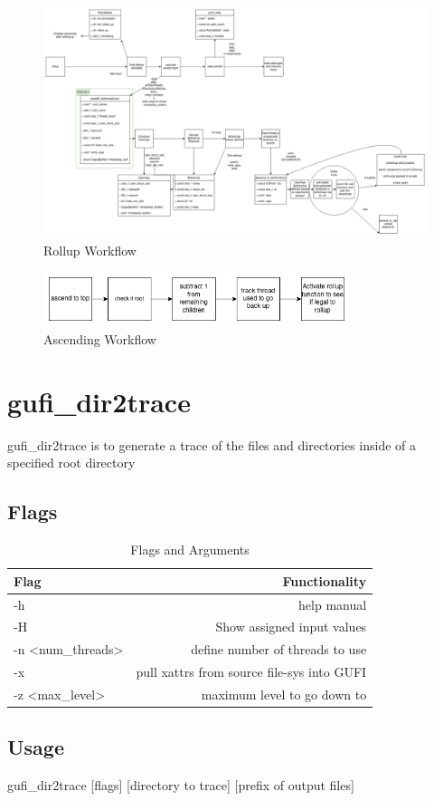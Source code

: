 \documentclass{article}
\begin{document}
\begin{figure} [h]
\centering
\includegraphics[width=1.2\textwidth]{rollup.png}
\caption{\label{fig:rollup}Rollup Workflow}
\end{figure}


\begin{figure} [h]
\centering
\includegraphics[width=0.8\textwidth]{ascending.png}
\caption{\label{fig:gufi_query} Ascending Workflow}
\end{figure}

\clearpage

\section{gufi\_dir2trace}
gufi\_dir2trace is to generate a trace of the files and directories inside of a specified root directory
\subsection{Flags}

\begin{table} [h]
\centering
\begin{tabular}{l|r}
Flag & Functionality \\\hline
-h & help manual \\
-H & Show assigned input values \\
-n \textless num\_threads\textgreater  & define number of threads to use \\
-x & pull xattrs from source file-sys into GUFI \\
-z \textless max\_level\textgreater & maximum level to go down to
\end{tabular}
\caption{\label{tab:widgets}Flags and Arguments}
\end{table}

\subsection{Usage}
gufi\_dir2trace [flags] [directory to trace] [prefix of output files]
\end{document}
